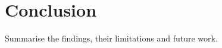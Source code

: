 \chapter{Conclusion}
\label{chap:conclusion}

Summarise the findings, their limitations and future work.
